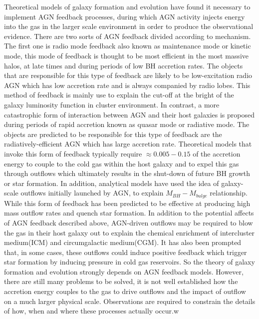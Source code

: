 \documentclass[../main.tex]{subfiles}
\begin{document}
Theoretical models of galaxy formation and evolution have found it necessary to implement AGN feedback processes, during which AGN activity injects energy into the gas in the larger scale environment in order to produce the observational evidence. There are two sorts of AGN feedback divided according to mechanism. The first one is radio mode feedback also known as maintenance mode or kinetic mode, this mode of feedback is  thought to be most efficient in the most massive halos, at late times and during periods of low BH accretion rates. The objects that are responsible for this type of feedback are likely to be low-excitation radio AGN which has low accretion rate and is always companied by radio lobes. This method of feedback is mainly use to explain the cut-off at the bright of the galaxy luminosity function in cluster environment. In contrast, a more catastrophic form of interaction between AGN and their host galaxies is proposed during periods of rapid accretion known as quasar mode or radiative mode. The objects are predicted to be responsible for this type of feedback are the radiatively-efficient AGN which has large accretion rate. Theoretical models that invoke this form of feedback typically require $\approx 0.005-0.15$ of the accretion energy to couple to the cold gas within the host galaxy and to expel this gas through outflows which ultimately results in the shut-down of future BH growth or star formation. In addition, analytical models have used the idea of galaxy-scale outflows initially launched by AGN, to explain $M_{BH}-M_{bulge}$ relationship. While this form of feedback has been predicted to be effective at producing high mass outflow rates and quench star formation. In addition to the potential affects of AGN feedback described above, AGN-driven outflows may be required to blow the gas in their host galaxy out to explain the chemical enrichment of intercluster medium(ICM) and circumgalactic medium(CGM). It has also been prompted that, in some cases, these outflows could induce positive feedback which trigger star formation by inducing pressure in cold gas reservoirs. So the theory of galaxy formation and evolution strongly depends on AGN feedback models. However, there are still many problems to be solved, it is not well established how the accretion energy couples to the gas to drive outflows and the impact of outflow on a much larger physical scale. Observations are required to constrain the details of how, when and where these processes actually occur.w
\end{document}
